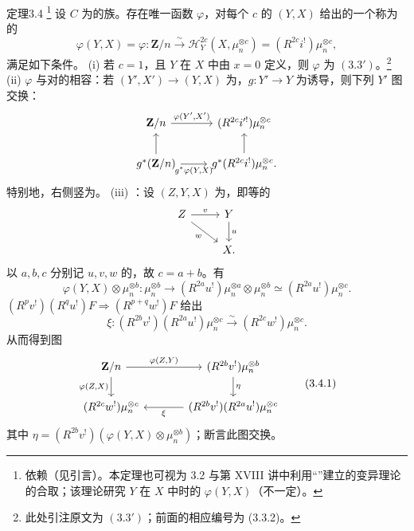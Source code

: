 \begin{SGAresult}{定理}{3.4}
\footnote{依赖（见引言）。本定理也可视为 3.2 与第 XVIII 讲中利用“”建立的变异理论的合取；该理论研究 $Y$ 在 $X$ 中时的 $\varphi(Y,X)$（不一定）。}
设 $C$ 为的族。存在唯一函数 $\varphi$，对每个 $c$ 的 $(Y,X)$ 给出的一个称为的
\[\varphi(Y,X)=\varphi:\mathbf Z/n\xrightarrow{\sim}\mathcal H_Y^{2c}(X,\mu_n^{\otimes c})=(R^{2c}i^!)\mu_n^{\otimes c},\]
满足如下条件。
(i) 若 $c=1$，且 $Y$ 在 $X$ 中由 $x=0$ 定义，则 $\varphi$ 为 $(3.3\prime)$。\footnote{此处引注原文为 $(3.3\prime)$；前面的相应编号为 (3.3.2)。}
(ii) $\varphi$ 与对的相容：若 $(Y',X')\to(Y,X)$ 为，$g:Y'\to Y$ 为诱导，则下列 $Y'$ 图交换：
\[\begin{tikzcd}\mathbf Z/n\arrow[r,"{\varphi(Y',X')}"]&(R^{2c}i'^!)\mu_n^{\otimes c}\\g^*(\mathbf Z/n)\arrow[u]\arrow[r,"{g^*\varphi(Y,X)}"']&g^*(R^{2c}i^!)\mu_n^{\otimes c}\arrow[u].\end{tikzcd}\]
特别地，右侧竖为。
(iii) ：设 $(Z,Y,X)$ 为，即等的
\[\begin{tikzcd}Z\arrow[r,"v"]\arrow[dr,"w"']&Y\arrow[d,"u"]\\&X.\end{tikzcd}\]
以 $a,b,c$ 分别记 $u,v,w$ 的，故 $c=a+b$。有
\[\varphi(Y,X)\otimes\mu_n^{\otimes b}:\mu_n^{\otimes b}\longrightarrow(R^{2a}u^!)\mu_n^{\otimes a}\otimes\mu_n^{\otimes b}\simeq(R^{2a}u^!)\mu_n^{\otimes c}.\]
 $(R^pv^!)(R^qu^!)F\Rightarrow(R^{p+q}w^!)F$ 给出
\[\xi:(R^{2b}v^!)(R^{2a}u^!)\mu_n^{\otimes c}\xrightarrow{\sim}(R^{2c}w^!)\mu_n^{\otimes c}.\]
从而得到图
\[\begin{tikzcd}[column sep=large]\mathbf Z/n\arrow[r,"{\varphi(Z,Y)}"]\arrow[d,"{\varphi(Z,X)}"']&(R^{2b}v^!)\mu_n^{\otimes b}\arrow[d,"\eta"]\\(R^{2c}w^!)\mu_n^{\otimes c}&(R^{2b}v^!)(R^{2a}u^!)\mu_n^{\otimes c}\arrow[l,"\xi"]\end{tikzcd}\tag{3.4.1}\]
其中 $\eta=(R^{2b}v^!)(\varphi(Y,X)\otimes\mu_n^{\otimes b})$；断言此图交换。
\end{SGAresult}
